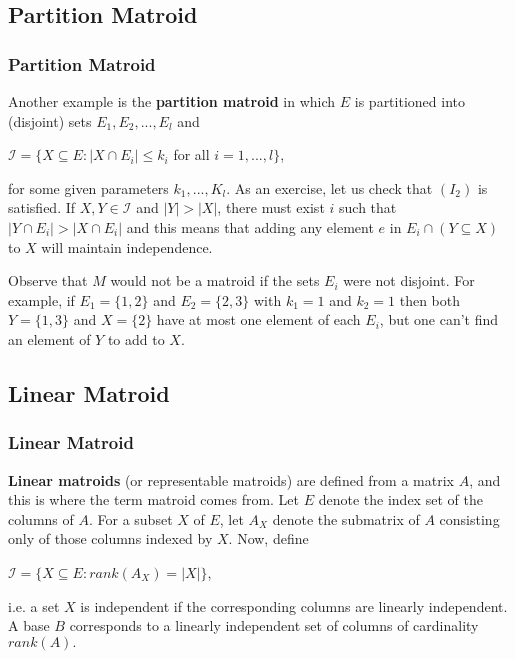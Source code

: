 \documentclass{beamer}
\begin{document}
\subsection{Partition Matroid}
\begin{frame}\frametitle{Partition Matroid}
\begin{block}{}
Another example is the \textbf{partition matroid} in which $E$ is partitioned into (disjoint) sets $E_1, E_2, ..., E_l$ and \\
\centerline{$\mathcal{I} = \lbrace X \subseteq E: |X \cap E_i| \leq k_i$ for all $i = 1, ..., l \rbrace$,}
for some given parameters $k_1, ..., K_l$. As an exercise, let us check that $(I_2)$ is satisfied. If $X, Y \in \mathcal{I}$ and $|Y| > |X|$, there must exist $i$ such that $|Y \cap E_i| > |X \cap E_i|$ and this means that adding any element $e$ in $E_i \cap (Y \subseteq X)$ to $X$ will maintain independence.
\end{block}
\begin{block}{}
Observe that $M$ would not be a matroid if the sets $E_i$ were not disjoint. For example, if $E_1 = \lbrace 1, 2 \rbrace$ and $E_2 = \lbrace 2, 3 \rbrace$ with $k_1 = 1$ and $k_2 = 1$ then both $Y = \lbrace 1, 3 \rbrace$ and $X = \lbrace 2 \rbrace$ have at most one element of each $E_i$, but one can't find an element of $Y$ to add to $X$.
\end{block}
\end{frame}

\subsection{Linear Matroid}
\begin{frame}\frametitle{Linear Matroid}
\begin{block}{}
\textbf{Linear matroids} (or representable matroids) are defined from a matrix $A$, and this is where the term matroid comes from. Let $E$ denote the index set of the columns of $A$. For a subset $X$ of $E$, let $A_X$ denote the submatrix of $A$ consisting only of those columns indexed by $X$. Now, define \\
\centerline{$\mathcal{I} = \lbrace X \subseteq E: rank(A_X) = |X| \rbrace$,}
i.e. a set $X$ is independent if the corresponding columns are linearly independent. A base $B$ corresponds to a linearly independent set of columns of cardinality $rank(A).$
\end{block}
\end{frame}
\end{document}
